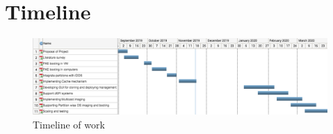 \documentclass[a4paper,12pt]{article}
\begin{document}
\section{\fontsize{16pt}{1em} Timeline}
 \begin{figure}[h!]
    \centering
    \includegraphics[width=\linewidth]{ganntt1.png}
    \caption{Timeline of work}
    \label{timeline}
\end{figure}


\newpage


    
\end{document}
